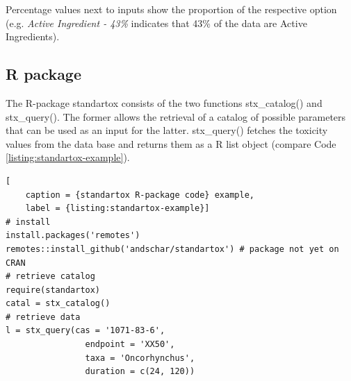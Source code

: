 Percentage values next to inputs show the proportion of the respective option (e.g. \textit{Active Ingredient - 43\%} indicates that 43\% of the data are Active Ingredients).

\subsection*{R package}
The R-package standartox consists of the two functions stx\_catalog() and stx\_query(). The former allows the retrieval of a catalog of possible parameters that can be used as an input for the latter. stx\_query() fetches the toxicity values from the data base and returns them as a R list object (compare Code \ref{listing:standartox-example}).

\begin{lstlisting}[
    caption = {standartox R-package code} example,
    label = {listing:standartox-example}]
# install
install.packages('remotes')
remotes::install_github('andschar/standartox') # package not yet on CRAN
# retrieve catalog    
require(standartox)
catal = stx_catalog()
# retrieve data
l = stx_query(cas = '1071-83-6',
                endpoint = 'XX50',
                taxa = 'Oncorhynchus',
                duration = c(24, 120))
\end{lstlisting}

